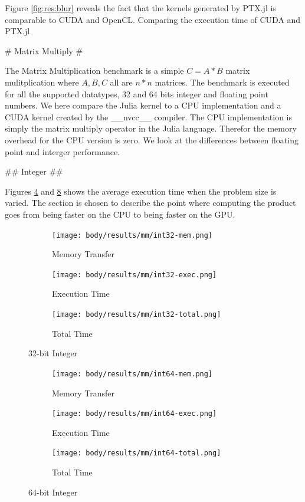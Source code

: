 \begin{markdown}
Figure \ref{fig:res:blur} reveals the fact that the kernels generated
by PTX.jl is comparable to CUDA and OpenCL. Comparing the execution
time of CUDA and PTX.jl

# Matrix Multiply #

The Matrix Multiplication benchmark is a simple $C = A * B$ matrix
mulitplication where $A, B, C$ all are $n*n$ matrices. The benchmark
is executed for all the supported datatypes, 32 and 64 bits integer
and floating point numbers. We here compare the Julia kernel to a CPU
implementation and a CUDA kernel created by the __nvcc__ compiler.
The CPU implementation is simply the matrix multiply operator in the
Julia language. Therefor the memory overhead for the CPU version is
zero. We look at the differences between floating point and interger
performance.

## Integer ##

Figures \ref{fig:res:mm:int32} and \ref{fig:res:mm:int64} shows the
average execution time when the problem size is varied. The section is
chosen to describe the point where computing the product goes from
being faster on the CPU to being faster on the GPU. 

\begin{figure}[H]
  \centering
  \begin{subfigure}{.33\textwidth}
    \centering
    \texttt{[image: body/results/mm/int32-mem.png]}
    \caption{Memory Transfer}
    \label{fig:res:mm:int32:mem}
  \end{subfigure}%
  \begin{subfigure}{.33\textwidth}
    \centering
    \texttt{[image: body/results/mm/int32-exec.png]}
    \caption{Execution Time}
    \label{fig:res:mm:int32:exec}
  \end{subfigure}%
  \begin{subfigure}{.33\textwidth}
    \centering
    \texttt{[image: body/results/mm/int32-total.png]}
    \caption{Total Time}
    \label{fig:res:mm:int32:tot}
  \end{subfigure}
  \caption{32-bit Integer}
  \label{fig:res:mm:int32}
\end{figure}

\begin{figure}[H]
  \centering
  \begin{subfigure}{.33\textwidth}
    \centering
    \texttt{[image: body/results/mm/int64-mem.png]}
    \caption{Memory Transfer}
    \label{fig:res:mm:int64:mem}
  \end{subfigure}%
  \begin{subfigure}{.33\textwidth}
    \centering
    \texttt{[image: body/results/mm/int64-exec.png]}
    \caption{Execution Time}
    \label{fig:res:mm:int64:exec}
  \end{subfigure}%
  \begin{subfigure}{.33\textwidth}
    \centering
    \texttt{[image: body/results/mm/int64-total.png]}
    \caption{Total Time}
    \label{fig:res:mm:int64:tot}
  \end{subfigure}
  \caption{64-bit Integer}
  \label{fig:res:mm:int64}
\end{figure}


\end{markdown}
